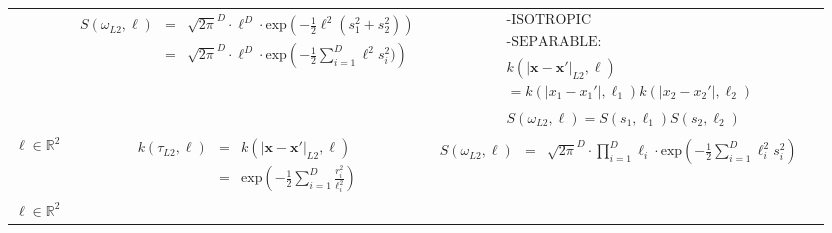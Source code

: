 \documentclass[]{interact}
\theoremstyle{plain}%
\theoremstyle{definition}
\theoremstyle{remark}
\begin{document}
\begin{landscape}
\begin{table}[H]
\begin{center}
\begin{tabular}{|c|c|c|c|}
       & \multicolumn{1}{|p{8.2cm}|}{\small
         \begin{eqnarray*}
		S(\omega_{L2},\ell) &=& \sqrt{2\pi}^D \cdot \ell^D \cdot \mathrm{exp}\left(-\frac{1}{2} \ell^2 (s_1^2 + s_2^2) \right) \\
		&=& \sqrt{2\pi}^D \cdot \ell^D \cdot \mathrm{exp}\left(-\frac{1}{2} \sum_{i=1}^D \ell^2 s_i^2) \right)
         \end{eqnarray*}
       }
       
       & \multicolumn{1}{|p{6.2cm}|}{\small
         \begin{eqnarray*}
        &&\text{-ISOTROPIC}\\
        \\
		&&\text{-SEPARABLE:} \\
		\\
		&&k(|\bm{x}-\bm{x}'|_{L2},\bm{\ell})\\
		 &&= k(|x_1-x_1'|,\ell_1)k(|x_2-x_2'|,\ell_2)\\
		 \\
		&&S(\omega_{L2},\bm{\ell})= S(s_1,\ell_1)S(s_2,\ell_2)
         \end{eqnarray*}
       }\\
        \cline{1-3}
         
       \multicolumn{1}{|p{1.5cm}|}{
       \vspace{1mm}
       $\bm{\ell} \in \mathbb{R}^2$
       }
       
         & \multicolumn{1}{|p{7.2cm}|}{\small
         \begin{eqnarray*}
		k(\tau_{L2},\bm{\ell}) &=& k(|\bm{x}-\bm{x}'|_{L2},\bm{\ell})\\
		&=& \mathrm{exp}\left(-\frac{1}{2} \sum_{i=1}^{D}\frac{r_i^2}{\ell_i^2} \right)
         \end{eqnarray*}
       }
       
       & \multicolumn{1}{|p{8.2cm}|}{\small
       \begin{eqnarray*}
		S(\omega_{L2},\bm{\ell}) &=& \sqrt{2\pi}^D \cdot \prod_{i=1}^D \ell_i \cdot \mathrm{exp}\left(-\frac{1}{2} \sum_{i=1}^D \ell_i^2 s_i^2 \right)
	   \end{eqnarray*}
       }
       
       & \multicolumn{1}{|p{6.2cm}|}{\small

       } \\  
       
       \cline{1-3}
       
       \multicolumn{1}{|p{1.5cm}|}{
       \vspace{1mm}
       $\bm{\ell} \in \mathbb{R}^2$
       
}
\end{tabular}
\end{center}
\end{table}
\end{landscape}
\end{document}
